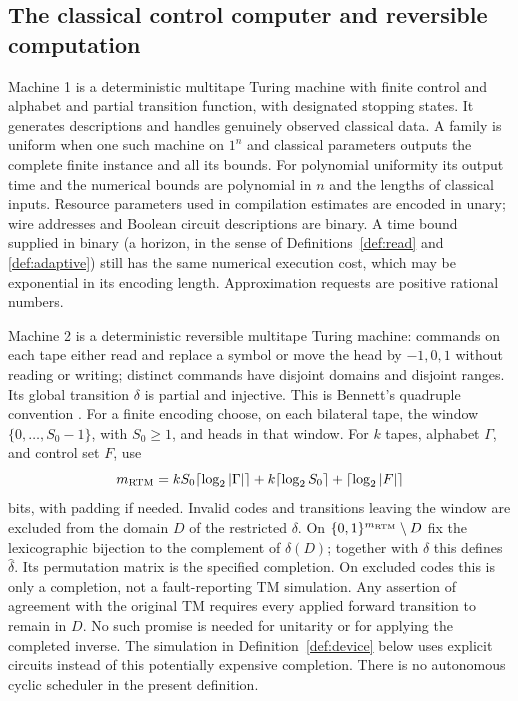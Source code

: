\subsection{The classical control computer and reversible computation}

\begin{definition}\label{def:rtm}
Machine 1 is a deterministic multitape Turing machine with finite control
and alphabet and partial transition function, with designated stopping
states. It generates descriptions and handles genuinely observed classical
data. A family is uniform when one such machine on $1^n$ and classical
parameters outputs the complete finite instance and all its bounds.
For polynomial uniformity its output time and the numerical bounds are
polynomial in $n$ and the lengths of classical inputs. Resource parameters
used in compilation estimates are encoded in unary; wire addresses and
Boolean circuit descriptions are binary. A time bound supplied in binary (a horizon, in the sense of
Definitions~\ref{def:read} and \ref{def:adaptive}) still has the same
numerical execution cost, which may be exponential in its encoding length. Approximation requests are positive rational numbers.

Machine 2 is a deterministic reversible multitape Turing machine:
commands on each tape either read and replace a symbol or move the head
by $-1,0,1$ without reading or writing; distinct commands have disjoint
domains and disjoint ranges. Its global transition $\delta$ is partial
and injective. This is Bennett's quadruple convention
\cite[pp.~526--527, definition preceding the main theorem]{Bennett1973}.
For a finite encoding choose, on each bilateral tape, the window
$\{0,\ldots,S_0-1\}$, with $S_0\geq1$, and heads in that window.
For $k$ tapes, alphabet $\Gamma$, and control set $F$, use
\[
 m_{\rm RTM}=kS_0\lceil\log_2|\Gamma|\rceil+
 k\lceil\log_2 S_0\rceil+\lceil\log_2|F|\rceil
\]
bits, with padding if needed. Invalid codes and transitions leaving the
window are excluded from the domain $D$ of the restricted $\delta$.
On $\{0,1\}^{m_{\rm RTM}}\setminus D$ fix the lexicographic bijection
to the complement of $\delta(D)$; together with $\delta$ this defines
$\widehat\delta$. Its permutation matrix is the specified completion.
On excluded codes this is only a completion, not a fault-reporting TM
simulation. Any assertion of agreement with the original TM requires
every applied forward transition to remain in $D$. No such promise is
needed for unitarity or for applying the completed inverse.
The simulation in Definition~\ref{def:device} below uses explicit circuits
instead of this potentially expensive completion. There is no autonomous
cyclic scheduler in the present definition.
\end{definition}

